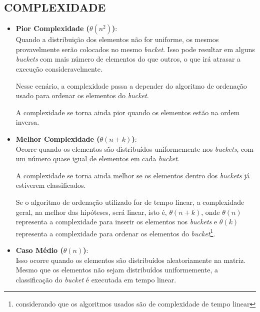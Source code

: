 	\subsection{\normalsize COMPLEXIDADE}\label{complex}
		\begin{itemize}
			\item \textbf{Pior Complexidade ($\theta(n^{2})$)}:\\
				Quando a distribuição dos elementos não for uniforme, os mesmos provavelmente serão colocados no mesmo \textit{bucket}. Isso pode resultar em alguns \textit{buckets} com mais número de elementos do que outros, o que irá atrasar a execução consideravelmente.
				
				Nesse cenário, a complexidade passa a depender do algoritmo de ordenação usado para ordenar os elementos do \textit{bucket}.
				
				A complexidade se torna ainda pior quando os elementos estão na ordem inversa.
			
			\item \textbf{Melhor Complexidade ($\theta(n + k)$)}:\\
				Ocorre quando os elementos são distribuídos uniformemente nos \textit{buckets}, com um número quase igual de elementos em cada \textit{bucket}.
				
				A complexidade se torna ainda melhor se os elementos dentro dos \textit{buckets} já estiverem classificados.

				Se o algoritmo de ordenação utilizado for de tempo linear, a complexidade geral, na melhor das hipóteses, será linear, isto é, $\theta(n + k)$, onde $\theta(n)$ representa a complexidade para inserir os elementos nos \textit{buckets} e $\theta(k)$ representa a complexidade para ordenar os elementos do \textit{bucket}\footnote{considerando que os algoritmos usados são de complexidade de tempo linear}.
				
			\item \textbf{Caso Médio ($\theta(n)$)}:\\
				Isso ocorre quando os elementos são distribuídos aleatoriamente na matriz. Mesmo que os elementos não sejam distribuídos uniformemente, a classificação do \textit{bucket} é executada em tempo linear.
		\end{itemize}